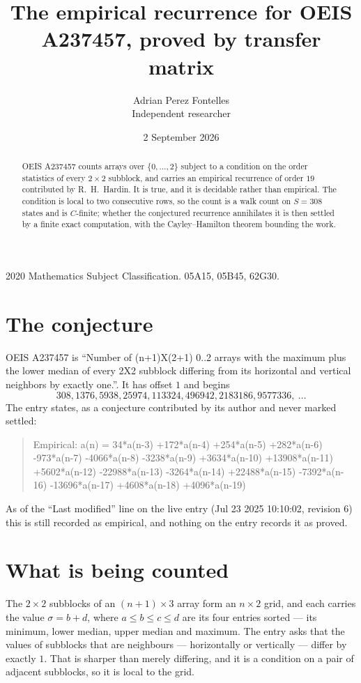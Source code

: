 \documentclass[11pt,a4paper]{article}
\title{The empirical recurrence for OEIS A237457, proved by transfer matrix}
\author{Adrian Perez Fontelles\\ \small Independent researcher}
\date{2 September 2026}
\theoremstyle{plain}
\theoremstyle{definition}
\begin{document}
\maketitle

\begin{abstract}
OEIS A237457 counts arrays over $\{0,\dots,2\}$ subject to a condition on the order
statistics of every $2\times2$ subblock, and carries an empirical recurrence of order
$19$ contributed by R.~H.~Hardin. It is true, and it is decidable rather than empirical.
The condition is local to two consecutive rows, so the count is a walk count on $S=308$
states and is $C$-finite; whether the conjectured recurrence annihilates it is then settled by
a finite exact computation, with the Cayley--Hamilton theorem bounding the work.
\end{abstract}

\noindent\small 2020 Mathematics Subject Classification. 05A15, 05B45, 62G30.\normalsize

\section{The conjecture}

OEIS A237457 is ``Number of (n+1)X(2+1) 0..2 arrays with the maximum plus the lower median of every 2X2 subblock differing from its horizontal and vertical neighbors by exactly one.''. It has offset $1$ and begins
\[
308, 1376, 5938, 25974, 113324, 496942, 2183186, 9577336,\ \dots
\]
The entry states, as a conjecture contributed by its author and never marked settled:
\begin{quote}
Empirical: a(n) = 34*a(n-3) +172*a(n-4) +254*a(n-5) +282*a(n-6) -973*a(n-7) -4066*a(n-8) -3238*a(n-9) +3634*a(n-10) +13908*a(n-11) +5602*a(n-12) -22988*a(n-13) -3264*a(n-14) +22488*a(n-15) -7392*a(n-16) -13696*a(n-17) +4608*a(n-18) +4096*a(n-19)
\end{quote}
As of the ``Last modified'' line on the live entry (Jul 23 2025 10:10:02, revision 6) this is still
recorded as empirical, and nothing on the entry records it as proved.

\section{What is being counted}

The $2\times2$ subblocks of an $(n+1)\times3$ array form an
$n\times2$ grid, and each carries the value $\sigma=b+d$, where $a\le b\le c\le d$ are its four entries sorted --- its minimum, lower median, upper median and maximum. The entry asks that the values of
subblocks that are neighbours --- horizontally or vertically --- differ by exactly $1$.
That is sharper than merely differing, and it is a condition on a pair of adjacent subblocks,
so it is local to the grid.
\end{document}

